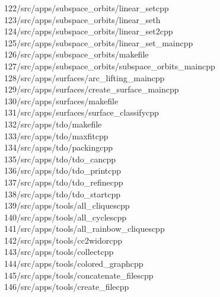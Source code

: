 \begin{tabbing}
122\>/src/apps/subspace\_orbits/linear\_setcpp\\[0pt]
123\>/src/apps/subspace\_orbits/linear\_seth\\[0pt]
124\>/src/apps/subspace\_orbits/linear\_set2cpp\\[0pt]
125\>/src/apps/subspace\_orbits/linear\_set\_maincpp\\[0pt]
126\>/src/apps/subspace\_orbits/makefile\\[0pt]
127\>/src/apps/subspace\_orbits/subspace\_orbits\_maincpp\\[0pt]
128\>/src/apps/surfaces/arc\_lifting\_maincpp\\[0pt]
129\>/src/apps/surfaces/create\_surface\_maincpp\\[0pt]
130\>/src/apps/surfaces/makefile\\[0pt]
131\>/src/apps/surfaces/surface\_classifycpp\\[0pt]
132\>/src/apps/tdo/makefile\\[0pt]
133\>/src/apps/tdo/maxfitcpp\\[0pt]
134\>/src/apps/tdo/packingcpp\\[0pt]
135\>/src/apps/tdo/tdo\_cancpp\\[0pt]
136\>/src/apps/tdo/tdo\_printcpp\\[0pt]
137\>/src/apps/tdo/tdo\_refinecpp\\[0pt]
138\>/src/apps/tdo/tdo\_startcpp\\[0pt]
139\>/src/apps/tools/all\_cliquescpp\\[0pt]
140\>/src/apps/tools/all\_cyclescpp\\[0pt]
141\>/src/apps/tools/all\_rainbow\_cliquescpp\\[0pt]
142\>/src/apps/tools/cc2widorcpp\\[0pt]
143\>/src/apps/tools/collectcpp\\[0pt]
144\>/src/apps/tools/colored\_graphcpp\\[0pt]
145\>/src/apps/tools/concatenate\_filescpp\\[0pt]
146\>/src/apps/tools/create\_filecpp\\[0pt]

\end{tabbing}
